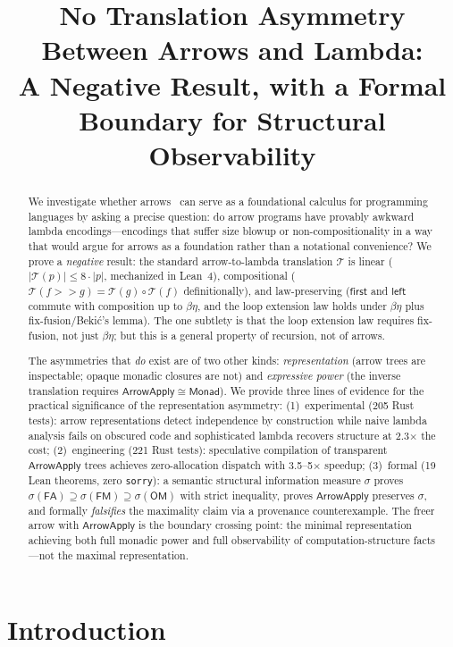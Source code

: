 \documentclass[11pt,a4paper]{article}
\title{No Translation Asymmetry Between Arrows and Lambda:\\
A Negative Result, with a Formal Boundary for Structural Observability}
\author{}
\date{}
\theoremstyle{definition}
\theoremstyle{remark}
\newcommand{\comp}{\mathbin{>\!\!>}}
\newcommand{\first}{\mathsf{first}}
\newcommand{\leftc}{\mathsf{left}}
\newcommand{\ArrowApply}{\mathsf{ArrowApply}}
\newcommand{\T}{\mathcal{T}}
\newcommand{\size}[1]{\lvert #1 \rvert}
\begin{document}
\maketitle

\begin{abstract}
We investigate whether arrows~\cite{hughes2000} can serve as a foundational
calculus for programming languages by asking a precise question: do arrow
programs have provably awkward lambda encodings---encodings that suffer size
blowup or non-compositionality in a way that would argue for arrows as a
foundation rather than a notational convenience? We prove a \emph{negative}
result: the standard arrow-to-lambda translation $\T$ is linear
($\size{\T(p)} \leq 8\cdot\size{p}$, mechanized in Lean~4), compositional
($\T(f \comp g) = \T(g) \circ \T(f)$ definitionally), and law-preserving
($\first$ and $\leftc$ commute with composition up to $\beta\eta$, and the
loop extension law holds under $\beta\eta$ plus fix-fusion/Beki\'c's lemma).
The one subtlety is that the loop extension law requires fix-fusion, not
just $\beta\eta$; but this is a general property of recursion, not of arrows.

The asymmetries that \emph{do} exist are of two other kinds:
\emph{representation} (arrow trees are inspectable; opaque monadic closures
are not) and \emph{expressive power} (the inverse translation requires
$\ArrowApply \cong \mathsf{Monad}$). We provide three lines of evidence for
the practical significance of the representation asymmetry: (1)~experimental
(205 Rust tests): arrow representations detect independence by construction
while naive lambda analysis fails on obscured code and sophisticated lambda
recovers structure at 2.3$\times$ the cost; (2)~engineering (221 Rust
tests): speculative compilation of transparent $\ArrowApply$ trees achieves
zero-allocation dispatch with 3.5--5$\times$ speedup; (3)~formal (19 Lean
theorems, zero \texttt{sorry}): a semantic structural information measure
$\sigma$ proves $\sigma(\mathsf{FA}) \supseteq \sigma(\mathsf{FM})
\supseteq \sigma(\mathsf{OM})$ with strict inequality, proves
$\ArrowApply$ preserves $\sigma$, and formally \emph{falsifies} the
maximality claim via a provenance counterexample. The freer arrow with
$\ArrowApply$ is the boundary crossing point: the minimal representation
achieving both full monadic power and full observability of
computation-structure facts---not the maximal representation.
\end{abstract}

\section{Introduction}
\end{document}
